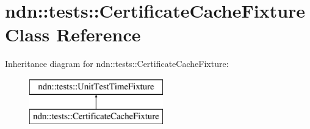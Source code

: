 \hypertarget{classndn_1_1tests_1_1CertificateCacheFixture}{}\section{ndn\+:\+:tests\+:\+:Certificate\+Cache\+Fixture Class Reference}
\label{classndn_1_1tests_1_1CertificateCacheFixture}
Inheritance diagram for ndn\+:\+:tests\+:\+:Certificate\+Cache\+Fixture\+:\begin{figure}[H]
\begin{center}
\leavevmode
\includegraphics[height=2.000000cm]{classndn_1_1tests_1_1CertificateCacheFixture}
\end{center}
\end{figure}
